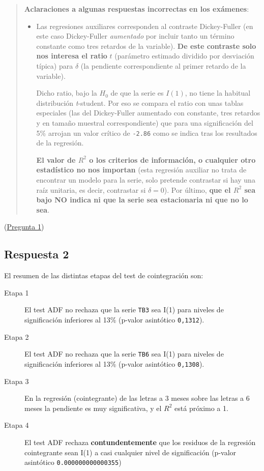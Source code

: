 \documentclass[10pt]{article}
\begin{document}
\begin{quote}
\textbf{Aclaraciones a algunas respuestas incorrectas en los exámenes}:

\begin{itemize}
\item Las regresiones auxiliares corresponden al contraste Dickey-Fuller
(en este caso Dickey-Fuller \emph{aumentado} por incluir tanto un término
constante como tres retardos de la variable). \textbf{De este contraste
solo nos interesa el ratio} \(t\) (parámetro estimado dividido por
desviación típica) para \(\delta\) (la pendiente correspondiente al
primer retardo de la variable). 

Dicho ratio, bajo la \(H_0\) de que la serie es \(I(1)\), no tiene la
habitual distribución \emph{t}-student. Por eso se compara el ratio con
unas tablas especiales (las del Dickey-Fuller aumentado con
constante, tres retardos y en tamaño muestral correspondiente) que
para una significación del 5\% arrojan un valor crítico de \texttt{-2.86}
como se indica tras los resultados de la regresión.

\textbf{El valor de \(R^2\) o los criterios de información, o cualquier otro
estadístico no nos importan} (esta regresión auxiliar no trata de
encontrar un modelo para la serie, solo pretende contrastar si hay
una raíz unitaria, es decir, contrastar si \(\delta=0\)). Por último,
\textbf{que el \(R^2\) sea bajo NO indica ni que la serie sea estacionaria ni
que no lo sea}.
\end{itemize}
\end{quote}


(\hyperref[sec:org6b7b13e]{Pregunta 1})
\subsection*{Respuesta 2}
\label{sec:org27b785e}

El resumen de las distintas etapas del test de cointegración son:
\begin{description}
\item[{Etapa 1}] El test ADF no rechaza que la serie \texttt{TB3} sea
I(1) para niveles de significación inferiores al 13\% (p-valor
asintótico \texttt{0,1312}).
\item[{Etapa 2}] El test ADF no rechaza que la serie \texttt{TB6} sea
I(1) para niveles de significación inferiores al 13\% (p-valor
asintótico \texttt{0,1308}).
\item[{Etapa 3}] En la regresión (cointegrante) de las letras a 3 meses
sobre las letras a 6 meses la pendiente es muy significativa, y el
\(R^2\) está próximo a 1.
\item[{Etapa 4}] El test ADF rechaza \textbf{contundentemente} que los residuos
de la regresión cointegrante sean I(1) a casi cualquier nivel
de significación (p-valor asintótico \texttt{0.000000000000355})
\end{description}
\end{document}
